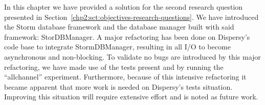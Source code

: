 In this chapter we have provided a solution for the second research question presented in Section~\ref{chp2:sct:objectives-research-questions}.
We have introduced the Storm database framework and the database manager built with said framework: StorDBManager.
A major refactoring has been done on Dispersy's code base to integrate StormDBManager, resulting in all I/O to become asynchronous and non-blocking.
To validate no bugs are introduced by this major refactoring, we have made use of the tests present and by running the \enquote{allchannel} experiment.
Furthermore, because of this intensive refactoring it became apparent that more work is needed on Dispersy's tests situation.
Improving this situation will require extensive effort and is noted as future work.
 
